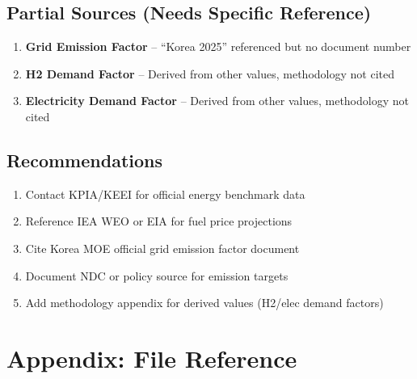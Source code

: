 \documentclass[12pt,a4paper]{article}
\begin{document}
\subsection{Partial Sources (Needs Specific Reference)}

\begin{enumerate}
    \item \textbf{Grid Emission Factor} -- ``Korea 2025'' referenced but no document number
    \item \textbf{H2 Demand Factor} -- Derived from other values, methodology not cited
    \item \textbf{Electricity Demand Factor} -- Derived from other values, methodology not cited
\end{enumerate}

\subsection{Recommendations}

\begin{enumerate}
    \item Contact KPIA/KEEI for official energy benchmark data
    \item Reference IEA WEO or EIA for fuel price projections
    \item Cite Korea MOE official grid emission factor document
    \item Document NDC or policy source for emission targets
    \item Add methodology appendix for derived values (H2/elec demand factors)
\end{enumerate}

\section*{Appendix: File Reference}
\end{document}
